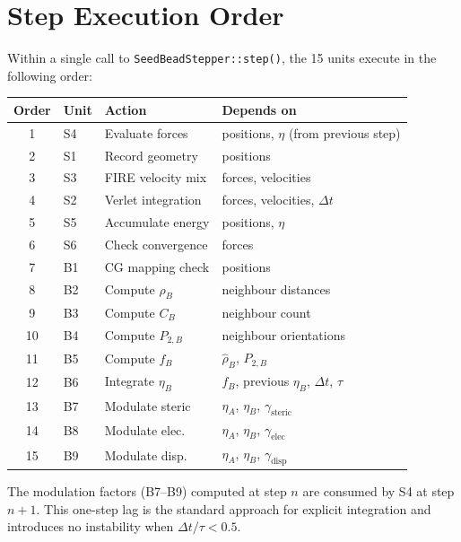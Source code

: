 \documentclass[11pt, a4paper, oneside]{article}
\newcommand{\type}[1]{\texttt{#1}}
\begin{document}
\newpage
\section{Step Execution Order}
\label{sec:execution-order}

Within a single call to \type{SeedBeadStepper::step()}, the 15 units
execute in the following order:

\begin{center}
\begin{tabular}{clll}
  \toprule
  \textbf{Order} & \textbf{Unit} & \textbf{Action} & \textbf{Depends on} \\
  \midrule
  1 & S4 & Evaluate forces     & positions, $\eta$ (from previous step) \\
  2 & S1 & Record geometry     & positions \\
  3 & S3 & FIRE velocity mix   & forces, velocities \\
  4 & S2 & Verlet integration  & forces, velocities, $\Delta t$ \\
  5 & S5 & Accumulate energy   & positions, $\eta$ \\
  6 & S6 & Check convergence   & forces \\
  \midrule
  7  & B1 & CG mapping check   & positions \\
  8  & B2 & Compute $\rho_B$   & neighbour distances \\
  9  & B3 & Compute $C_B$      & neighbour count \\
  10 & B4 & Compute $P_{2,B}$  & neighbour orientations \\
  11 & B5 & Compute $f_B$      & $\hat{\rho}_B$, $\hat{P}_{2,B}$ \\
  12 & B6 & Integrate $\eta_B$ & $f_B$, previous $\eta_B$, $\Delta t$, $\tau$ \\
  13 & B7 & Modulate steric    & $\eta_A$, $\eta_B$, $\gamma_{\text{steric}}$ \\
  14 & B8 & Modulate elec.     & $\eta_A$, $\eta_B$, $\gamma_{\text{elec}}$ \\
  15 & B9 & Modulate disp.     & $\eta_A$, $\eta_B$, $\gamma_{\text{disp}}$ \\
  \bottomrule
\end{tabular}
\end{center}

\noindent The modulation factors (B7--B9) computed at step $n$ are
consumed by S4 at step $n+1$.  This one-step lag is the standard
approach for explicit integration and introduces no instability when
$\Delta t / \tau < 0.5$.
\end{document}

